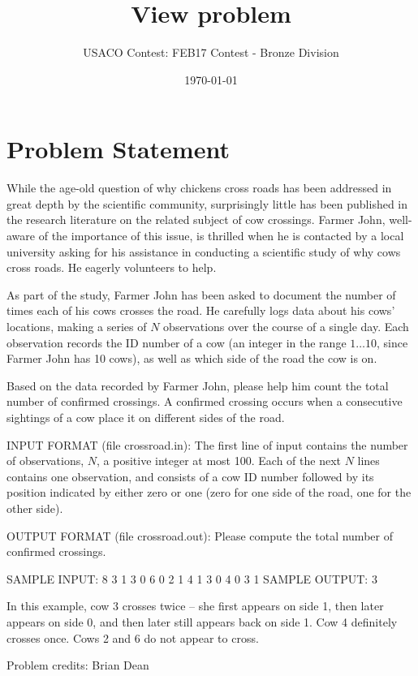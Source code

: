 \documentclass[12pt]{article}
\title{View problem}
\author{USACO Contest: FEB17 Contest - Bronze Division}
\date{\today}
\begin{document}
\maketitle

\section*{Problem Statement}

While the age-old question of why chickens cross roads has been addressed in
great depth by the scientific community, surprisingly little has been published
in the research literature on the related subject of cow crossings.  Farmer
John, well-aware of the importance of this issue, is thrilled when he is
contacted by a local university asking for his assistance in conducting a
scientific study of why cows cross roads.  He eagerly volunteers to help.

As part of the study, Farmer John has been asked to document the number of times
each of his cows crosses the road.  He carefully logs data about his cows'
locations, making a series of $N$ observations over the course of a single day. 
Each observation records the ID number of a cow (an integer in the range
$1 \ldots 10$, since Farmer John has 10 cows), as well as which side of the road
the cow is on.  

Based on the data recorded by Farmer John, please help him count the total
number of confirmed crossings.  A confirmed crossing occurs when a consecutive
sightings of a cow place it on different sides of the road.

INPUT FORMAT (file crossroad.in):
The first line of input contains the number of observations, $N$, a positive
integer at most 100. Each of the next $N$ lines contains one observation, and
consists of a cow ID number followed by its position indicated by either zero or
one (zero for one side of the road, one for the other side).

OUTPUT FORMAT (file crossroad.out):
Please compute the total number of confirmed crossings.

SAMPLE INPUT:
8
3 1
3 0
6 0
2 1
4 1
3 0
4 0
3 1
SAMPLE OUTPUT: 
3

In this example, cow 3 crosses twice -- she first appears on side 1, then later appears
on side 0, and then later still appears back on side 1. Cow 4 definitely crosses
once.  Cows 2 and 6 do not appear to cross.

Problem credits: Brian Dean
\end{document}
